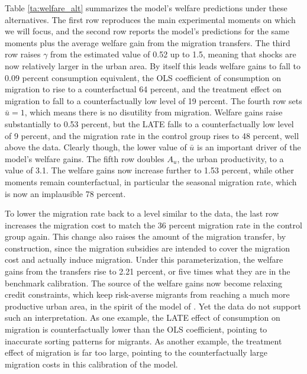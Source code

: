 \documentclass[12pt,pdftex]{article}
\begin{document}
\begin{table}[h]
{}
\end{table}

Table \ref{ta:welfare_alt} summarizes the model's welfare predictions under these alternatives. The first row reproduces the main experimental moments on which we will focus, and the second row reports the model's predictions for the same moments plus the average welfare gain from the migration transfers. The third row raises $\gamma$ from the estimated value of 0.52 up to 1.5, meaning that shocks are now relatively larger in the urban area. By itself this leads welfare gains to fall to 0.09 percent consumption equivalent, the OLS coefficient of consumption on migration to rise to a counterfactual 64 percent, and the treatment effect on migration to fall to a counterfactually low level of 19 percent. The fourth row sets $\bar{u}=1$, which means there is no disutility from migration. Welfare gains raise substantially to 0.53 percent, but the LATE falls to a counterfactually low level of 9 percent, and the migration rate in the control group rises to 48 percent, well above the data. Clearly though, the lower value of $\bar{u}$ is an important driver of the model's welfare gains. The fifth row doubles $A_u$, the urban productivity, to a value of 3.1. The welfare gains now increase further to 1.53 percent, while other moments remain counterfactual, in particular the seasonal migration rate, which is now an implausible 78 percent.

To lower the migration rate back to a level similar to the data, the last row increases the migration cost to match the 36 percent migration rate in the control group again. This change also raises the amount of the migration transfer, by construction, since the migration subsidies are intended to cover the migration cost and actually induce migration. Under this parameterization, the welfare gains from the transfers rise to 2.21 percent, or five times what they are in the benchmark calibration. The source of the welfare gains now become relaxing credit constraints, which keep risk-averse migrants from reaching a much more productive urban area, in the spirit of the model of \citet{brch14}. Yet the data do not support such an interpretation. As one example, the LATE effect of consumption on migration is counterfactually lower than the OLS coefficient, pointing to inaccurate sorting patterns for migrants. As another example, the treatment effect of migration is far too large, pointing to the counterfactually large migration costs in this calibration of the model.
\end{document}
